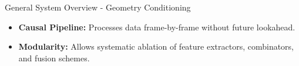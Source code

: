 \documentclass[8pt,hyperref={pdfpagelabels=true},xcolor=table,aspectratio=169]{beamer}
\begin{document}
\begin{frame}{General System Overview - Geometry Conditioning}
\begin{center}
    \end{center}
    \vspace{1.5em}
    \begin{itemize}
        \item \textbf{Causal Pipeline:} Processes data frame-by-frame without future lookahead.
        \item \textbf{Modularity:} Allows systematic ablation of feature extractors, combinators, and fusion schemes.
    \end{itemize}
\end{frame}
\end{document}

